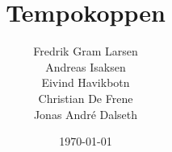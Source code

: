 \newcommand{\kopp}{Tempokoppen}
\newcommand{\mytitle}{\kopp}
\newcommand{\mygroupnumber}{59}
\newcommand{\myauthor}{Fredrik Gram Larsen\\Andreas Isaksen\\Eivind Havikbotn\\Christian De Frene\\Jonas André Dalseth}

\title{\mytitle}
\author{\myauthor}
\date{\today}
